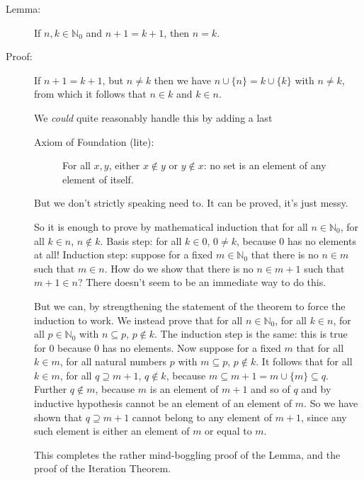 \documentclass[12pt]{article}
\begin{document}
\begin{description}
\begin{description}
\item[Lemma:]  If $n,k \in \mathbb N_0$ and $n+1=k+1$, then $n=k$.

\item[Proof:]  If $n+1=k+1$, but $n\neq k$ then we have $n \cup \{n\} = k \cup \{k\}$ with $n \neq k$, from which it follows
that $n \in k$ and $k \in n$.  

We {\em could\/} quite reasonably handle this by adding a last 

\begin{description}

\item[Axiom of Foundation (lite):]  For all $x,y$, either $x \not\in y$ or $y \not\in x$:  no set is an element of any element of itself.

\end{description}

But we don't strictly speaking need to.  It can be proved, it's just messy.

So it is enough to prove by mathematical induction that for all $n \in \mathbb N_0$, for all $k \in n$, $n \not\in k$.  Basis step:  for all $k \in 0$, $0 \neq k$, because 0 has no elements at all!  Induction step:  suppose for a fixed $m \in \mathbb N_0$ that there is no $n \in m$ such that $m \in n$.  How do we show that there is no $n \in m+1$ such that $m+1 \in n$?  There doesn't seem to be an immediate way to do this.



  But we can, by strengthening the statement of the theorem to force the induction to work.  We instead prove that for all $n \in \mathbb N_0$, for all $k \in n$, for all $p \in \mathbb N_0$ with $n \subseteq p$, $p \not\in k$.  The induction step is the same:  this is true for 0 because 0 has no elements.  Now suppose for a fixed $m$ that
for all $k \in m$, for all natural numbers $p$ with $m \subseteq p$, $p \not\in k$.   It follows that for all $k \in m$, for all $q \supseteq m+1$,  $q \not\in k$,
because $m \subseteq m+1 = m \cup \{m\}\subseteq q$.  Further $q \not\in m$, because $m$ is an element of $m+1$ and so of $q$ and by inductive hypothesis cannot be an element of an element of $m$. So we have shown that $q \supseteq m+1$ cannot belong to any element of $m+1$, since any such element is either an element of $m$ or equal to $m$.

This completes the rather mind-boggling proof of the Lemma, and the proof of the Iteration Theorem.


\end{description}
\end{description}
\end{document}
